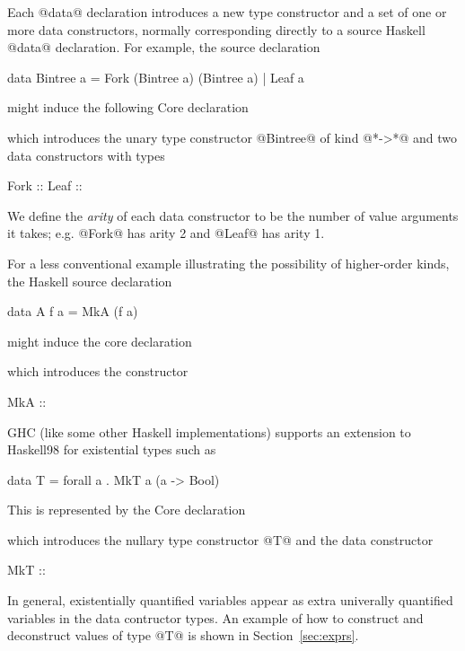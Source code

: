 \documentclass[10pt]{article}
\begin{document}
Each @data@ declaration introduces a new type constructor and a set of one or
more data constructors, normally corresponding directly to a source Haskell @data@ declaration.
For example, the source declaration
\begin{code}
data Bintree a =
   Fork (Bintree a) (Bintree a)
|  Leaf a
\end{code}
might induce the following Core declaration
which introduces the unary type constructor @Bintree@ of kind @*->*@  and two data constructors with types
\begin{code}
Fork :: %
Leaf :: %
\end{code}
We define the {\it arity} of each data constructor to be the number of value arguments it takes;
e.g. @Fork@ has arity 2 and @Leaf@ has arity 1.

For a less conventional example illustrating the possibility of higher-order kinds, the Haskell source declaration
\begin{code}
data A f a = MkA (f a)
\end{code}
might induce the core declaration
\begin{code}
\end{code}
which introduces the constructor
\begin{code}
MkA :: %
\end{code}


GHC (like some other Haskell implementations) supports an extension to Haskell98 
for existential types such as 
\begin{code}
data T = forall a . MkT a (a -> Bool)
\end{code}
This is represented by the Core declaration
\begin{code}
\end{code}
which introduces the nullary type constructor @T@ and the data constructor
\begin{code}
MkT :: %
\end{code}
In general, existentially quantified variables appear as extra univerally
quantified variables in the data contructor types.
An example of how to construct and deconstruct values of type @T@ is shown in 
Section~\ref{sec:exprs}.
\end{document}
